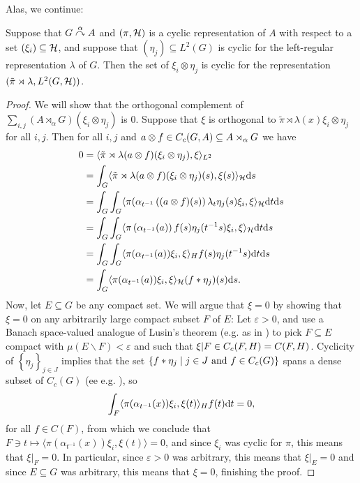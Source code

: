 Alas, we continue:
\begin{lemma}
Suppose that $G \stackrel{\alpha}{\curvearrowright} A$ and $(\pi,\mathcal{H})$ is a cyclic representation of $A$ with respect to a set $(\xi_i) \subseteq \mathcal{H}$, and suppose that $(\eta_j) \subseteq L^2(G)$ is cyclic for the left-regular representation $\lambda$ of $G$. Then the set of $\xi_i \otimes \eta_j$ is cyclic for the representation $(\tilde \pi \rtimes \lambda, L^2(G,\mathcal{H}))$.
\label{mult:cyclic1}
\end{lemma}
\begin{proof}
We will show that the orthogonal complement of $\sum_{i,j} (A \rtimes_\alpha G)(\xi_i \otimes \eta_j)$ is $0$. Suppose that $\xi$ is orthogonal to $\tilde \pi \rtimes \lambda(x) \xi_i \otimes \eta_j$ for all $i,j$. Then for all $i,j$ and $a \otimes f \in C_c(G,A) \subseteq A \rtimes_\alpha G$ we have
\begin{align*}
	0 &= \langle \tilde \pi \rtimes \lambda (a \otimes f) (\xi_i \otimes \eta_j) , \xi \rangle_{L^2}\\
	&= \int_G \langle \tilde \pi \rtimes \lambda (a \otimes f) (\xi_i \otimes \eta_j)(s) , \xi(s)\rangle_{\mathcal{H}} \mathrm{d} s \\
	&= \int_G \int_G \langle \pi(\alpha_{t^{-1}}\left( (a \otimes f)(s) \right) \lambda_t \eta_j(s) \xi_i , \xi \rangle_{\mathcal{H}} \mathrm{d} t \mathrm{d} s\\
	&= \int_G \int_G \langle \pi\left( \alpha_{t^{-1}} (a) \right) f(s) \eta_j(t^{-1}s) \xi_i , \xi \rangle_{\mathcal{H}} \mathrm{d} t\mathrm{d} s\\
	&= \int_G \int_G \langle \pi( \alpha_{t^{-1}}(a) ) \xi_i , \xi \rangle_H f(s) \eta_j(t^{-1}s) \mathrm{d} t \mathrm{d} s \\
	&= \int_G \langle \pi(\alpha_{t^{-1}}(a)) \xi_i , \xi \rangle_{\mathcal{H}} (f \ast \eta_j)(s) \mathrm{d} s.
\end{align*}
Now, let $E \subseteq G$ be any compact set. We will argue that $\xi = 0$ by showing that $\xi = 0$ on any arbitrarily large compact subset $F$ of $E$: Let $\varepsilon > 0$, and use a Banach space-valued analogue of Lusin's theorem (e.g. as in \cite[Appendix B]{williamscrossed}) to pick $F \subseteq E$ compact with $\mu(E\backslash F) < \varepsilon$ and such that $\xi|F \in C_c(F,H)=C(F,H)$. Cyclicity of $\left\{ \eta_j \right\}_{j \in J}$ implies that the set $\{f \ast \eta_j \mid j \in J \text{ and } f \in C_c(G)\}$ spans a dense subset of $C_c(G)$ (ee e.g. \cite[Proposition 3.33]{folland2016fourier}), so
\begin{align*}
	\int_{F} \langle \pi(\alpha_{t^{-1}}(x)) \xi_i , \xi(t) \rangle_H f(t) \mathrm{d} t = 0,
\end{align*}
for all $f \in C(F)$, from which we conclude that $F \ni t \mapsto \langle \pi(\alpha_{t^{-1}}(x)) \xi_i , \xi(t) \rangle=0$, and since $\xi_i$ was cyclic for $\pi$, this means that $\xi|_F = 0$. In particular, since $\varepsilon > 0$ was arbitrary, this means that $\xi|_E = 0$ and since $E \subseteq G$ was arbitrary, this means that $\xi = 0$, finishing the proof.
\end{proof}


